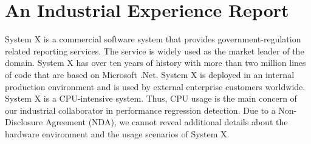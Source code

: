 \section{An Industrial Experience Report} \label{sec:deploymentinindustry}

System X is a commercial software system that provides government-regulation related reporting services. The service is widely used as the market leader of the domain. 
System X has over ten years of history with more than two million lines of code that are based on Microsoft .Net. 
System X is deployed in an internal production environment and is used by external enterprise customers worldwide. 
System X is a CPU-intensive system. 
Thus, CPU usage is the main concern of our industrial collaborator in performance regression detection.
Due to a Non-Disclosure Agreement (NDA), we cannot reveal additional details about the hardware environment and the usage scenarios of System X.


